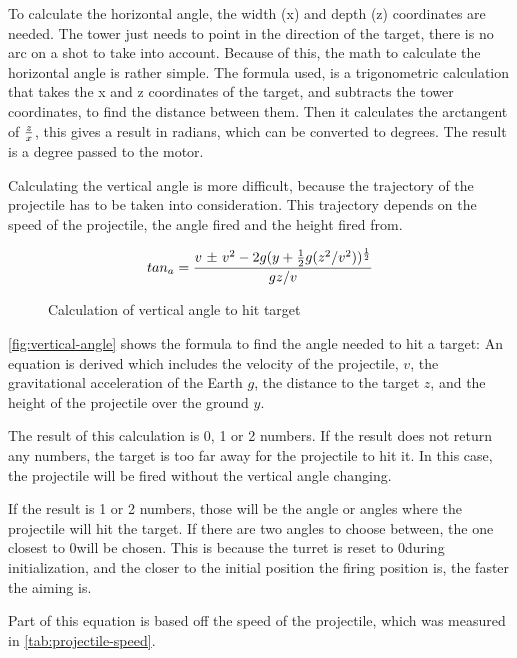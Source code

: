 

To calculate the horizontal angle, the width (x) and depth (z) coordinates are needed. The tower just needs to point in the direction of the target, there is no arc on a shot to take into account. Because of this, the math to calculate the horizontal angle is rather simple. The formula used, is a trigonometric calculation that takes the x and z coordinates of the target, and subtracts the tower coordinates, to find the distance between them. Then it calculates the arctangent of $z \over x$, this gives a result in radians, which can be converted to degrees. The result is a degree passed to the motor.

Calculating the vertical angle is more difficult, because the trajectory of the projectile has to be taken into consideration. This trajectory depends on the speed of the projectile, the angle fired and the height fired from.

\begin{figure}[htbp]
$$tan_a = {v \text{ \textpm} \text{ } v^2 - 2g(y + {1 \over 2}g(z^2/v^2))^{1 \over 2} \over gz/v}$$
\caption{Calculation of vertical angle to hit target}
\label{fig:vertical-angle}
\end{figure}

\autoref{fig:vertical-angle} shows the formula to find the angle needed to hit a target: An equation is derived which includes the velocity of the projectile, $v$, the gravitational acceleration of the Earth $g$, the distance to the target $z$, and the height of the projectile over the ground $y$. 

The result of this calculation is 0, 1 or 2 numbers. If the result does not return any numbers, the target is too far away for the projectile to hit it. In this case, the projectile will be fired without the vertical angle changing. 

If the result is 1 or 2 numbers, those will be the angle or angles where the projectile will hit the target. If there are two angles to choose between, the one closest to 0\textdegree \text{ }will be chosen. This is because the turret is reset to 0\textdegree \text{ }during initialization, and the closer to the initial position the firing position is, the faster the aiming is. 

Part of this equation is based off the speed of the projectile, which was measured in \autoref{tab:projectile-speed}. 
